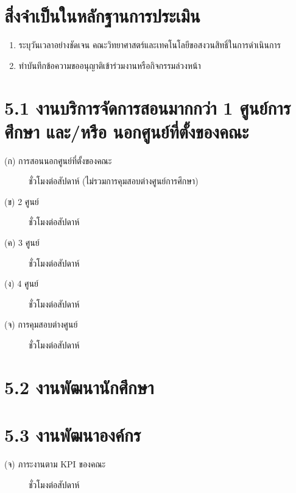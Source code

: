\documentclass[a4paper,12pt,english]{sphinxmanual}
\begin{document}
\section{สิ่งจำเป็นในหลักฐานการประเมิน}
\label{\detokenize{5etc:id3}}\begin{enumerate}
%
\item {} 
 ระบุวันเวลาอย่างชัดเจน คณะวิทยาศาสตร์และเทคโนโลยีขอสงวนสิทธิ์ในการดำเนินการ

\item {} 
ทำบันทึกข้อความขออนุญาติเข้าร่วมงานหรือกิจกรรมล่วงหน้า

\end{enumerate}


\section{5.1 งานบริการจัดการสอนมากกว่า 1 ศูนย์การศึกษา และ/หรือ นอกศูนย์ที่ตั้งของคณะ}
\label{\detokenize{5etc:id4}}\begin{description}
\item[{(ก) การสอนนอกศูนย์ที่ตั้งของคณะ}]  ชั่วโมงต่อสัปดาห์ (ไม่รวมการคุมสอบต่างศูนย์การศึกษา)

\item[{(ข) 2 ศูนย์}]  ชั่วโมงต่อสัปดาห์

\item[{(ค) 3 ศูนย์}]  ชั่วโมงต่อสัปดาห์

\item[{(ง) 4 ศูนย์}]  ชั่วโมงต่อสัปดาห์

\item[{(จ) การคุมสอบต่างศูนย์}]  ชั่วโมงต่อสัปดาห์

\end{description}


\section{5.2 งานพัฒนานักศึกษา}
\label{\detokenize{5etc:id5}}

\section{5.3 งานพัฒนาองค์กร}
\label{\detokenize{5etc:id6}}\begin{description}
\item[{(จ) ภาระงานตาม KPI ของคณะ}]  ชั่วโมงต่อสัปดาห์

\end{description}
\end{document}
